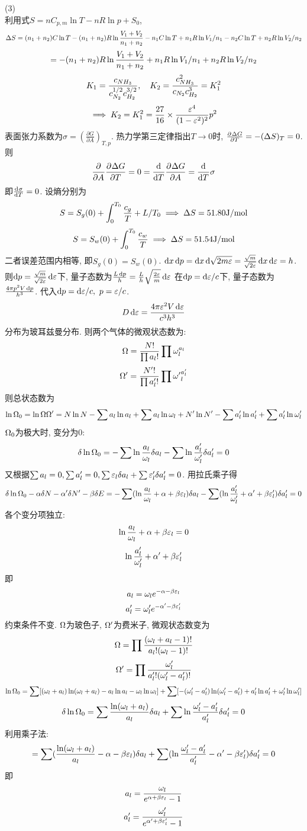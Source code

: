 \documentclass[UTF8,9pt]{ctexart}
\begin{document}
(3)\\
利用式$S=nC_{p,m}\ln T-nR\ln p+S_0$,
$$\Delta S = (n_1+n_2)C\ln T-(n_1+n_2)R\ln\frac{V_1+V_2}{n_1+n_2}-n_1C\ln T+n_1R\ln V_1/n_1-n_2C\ln T+n_2R\ln V_2/n_2$$
$$=-(n_1+n_2)R\ln\frac{V_1+V_2}{n_1+n_2}+n_1R\ln V_1/n_1+n_2R\ln V_2/n_2$$
$$K_1 = \frac{c_{NH_3}}{c_{N_2}^{1/2}c_{H_2}^{3/2}},\quad K_2 = \frac{c^2_{NH_3}}{c_{N_2}c_{H_2}^{3}}=K_1^2$$
$$\implies K_2=K_1^2 = \frac{27}{16}\times\frac{\varepsilon^4}{(1-\varepsilon^2)^2}p^2$$
表面张力系数为$\sigma=(\frac{\partial G}{\partial A})_{T, p}$. 热力学第三定律指出$T\rightarrow0$时, $\frac{\partial^{} \Delta G}{\partial {T}^{}}=-(\Delta S)_T = 0$.\\
则$$\frac{\partial^{} }{\partial {A}^{}}\frac{\partial^{} \Delta G}{\partial {T}^{}}=0=\frac{\mathrm{d}^{} }{\mathrm{d} {T}^{}}\frac{\partial^{} \Delta G}{\partial {A}^{}} = \frac{\mathrm{d}^{} }{\mathrm{d} {T}^{}}\sigma$$
即$\frac{\mathrm{d}^{} \sigma}{\mathrm{d} {T}^{}} = 0$.
设熵分别为
$$S=S_g(0)+\int_0^{T_0}\frac{c_g}{T}+L/T_0\implies \Delta S = 51.80\text{J/mol}$$
$$S=S_w(0)+\int_0^{T_0}\frac{c_w}{T}\implies \Delta S= 51.54\text{J/mol}$$
二者误差范围内相等, 即$S_g(0)=S_w(0)$.
$\mathop{}\!\mathrm{d} x\mathop{}\!\mathrm{d} p = \mathop{}\!\mathrm{d} x \mathop{}\!\mathrm{d}\sqrt{2m\varepsilon}=\frac{\sqrt{m}}{\sqrt{2\varepsilon}}\mathop{}\!\mathrm{d} x\mathop{}\!\mathrm{d} \varepsilon=h$. 则$\mathop{}\!\mathrm{d} p =\frac{\sqrt{m}}{\sqrt{2\varepsilon}}\mathop{}\!\mathrm{d} \varepsilon$下, 量子态数为$\frac{L\mathop{}\!\mathrm{d} p}{h} = \frac{L}{h}\sqrt{\frac{2\varepsilon}{m}}\mathop{}\!\mathrm{d}\varepsilon$
在$\mathop{}\!\mathrm{d} p=\mathop{}\!\mathrm{d}\varepsilon/c$下, 量子态数为$\frac{4\pi p^2V\mathop{}\!\mathrm{d} p}{h^3}$. 代入$\d p=\d\ep/c,\ p=\ep/c$.
$$D\mathop{}\!\mathrm{d}\varepsilon = \frac{4\pi \varepsilon^2V\mathop{}\!\mathrm{d}\varepsilon}{c^3h^3}$$
分布为玻耳兹曼分布. 则两个气体的微观状态数为:
$$\Omega=\frac{N!}{\prod a_l!}\prod \omega_l^{a_l}$$
$$\Omega'=\frac{N'!}{\prod a_l'!} \prod {\omega'}_l^{a_l'}$$
则总状态数为
$$\ln\Omega_0 = \ln\Omega\Omega' = N\ln N-\sum a_l\ln a_l+\sum a_l\ln \omega_l+N'\ln N'-\sum a'_l\ln a'_l+\sum a'_l\ln \omega'_l$$
$\Omega_0$为极大时, 变分为0:
$$\delta\ln\Omega_0 = -\sum\ln\frac{a_l}{\omega_l}\delta a_l-\sum\ln\frac{a'_l}{\omega'_l}\delta a'_l=0$$
又根据$\sum a_l=0, \sum a'_l=0, \sum\varepsilon_l\delta a_l+\sum\varepsilon'_l\delta a'_l=0$. 用拉氏乘子得
$$\delta\ln\Omega_0-\alpha\delta N-\alpha'\delta N'-\beta\delta E = -\sum(\ln\frac{a_l}{\omega_l}+\alpha+\beta\varepsilon_l)\delta a_l-\sum(\ln\frac{a'_l}{\omega'_l}+\alpha'+\beta\varepsilon'_l)\delta a'_l=0$$
各个变分项独立: 
$$\ln\frac{a_l}{\omega_l}+\alpha+\beta\varepsilon_l=0$$
$$\ln\frac{a'_l}{\omega'_l}+\alpha'+\beta\varepsilon'_l$$
即
$$a_l=\omega_le^{-\alpha-\beta\varepsilon_l}$$
$$a'_l=\omega'_le^{-\alpha'-\beta\varepsilon'_l}$$
约束条件不变. $\Omega$为玻色子, $\Omega'$为费米子, 微观状态数变为
$$\Omega=\prod \frac{(\omega_l+a_l-1)!}{a_l!(\omega_l-1)!}$$
$$\Omega'=\prod \frac{\omega'_l}{a'_l!(\omega'_l-a_l')!}$$
$$\ln\Omega_0 = \sum[(\omega_l+a_l)\ln(\omega_l+a_l)-a_l\ln a_l-\omega_l\ln\omega_l]+\sum[-(\omega'_l-a'_l)\ln(\omega'_l-a'_l)+a'_l\ln a'_l+\omega'_l\ln\omega'_l]$$
$$\delta\ln\Omega_0 = \sum \frac{\ln(\omega_l+a_l)}{a_l}\delta a_l+\sum\ln\frac{\omega_l'-a'_l}{a'_l}\delta a_l'=0$$
利用乘子法:
$$=\sum (\frac{\ln(\omega_l+a_l)}{a_l}-\alpha-\beta\varepsilon_l)\delta a_l+\sum (\ln\frac{\omega_l'-a'_l}{a'_l}-\alpha'-\beta\varepsilon_l')\delta a_l'=0$$
即
$$a_l=\frac{\omega_l}{e^{\alpha+\beta\varepsilon_l}-1}$$
$$a'_l=\frac{\omega'_l}{e^{\alpha'+\beta\varepsilon'_l}-1}$$
\end{document}
